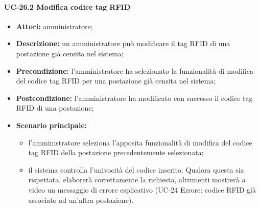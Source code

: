 \paragraph{UC-26.2 Modifica codice tag RFID}
\begin{itemize}
    \item \textbf{Attori:} amministratore;
    \item \textbf{Descrizione:} un amministratore pu\`{o} modificare il tag RFID di una postazione già censita nel sistema;
    \item \textbf{Precondizione:} l'amministratore ha selezionato la funzionalità di modifica del codice tag RFID per una postazione già censita nel sistema;
    \item \textbf{Postcondizione:} l'amministratore ha modificato con successo il codice tag RFID di una postazione;
    \item \textbf{Scenario principale:}
    \begin{itemize}
        \item l'amministratore seleziona l'apposita funzionalità di modifica del codice tag RFID della postazione precedentemente selezionata;
        \item il sistema controlla l'univocità del codice inserito. Qualora questa sia rispettata, elaborerà correttamente la richiesta, altrimenti mostrerà a video un messaggio di errore esplicativo (UC-24 Errore: codice RFID già associato ad un'altra postazione).
    \end{itemize}
\end{itemize}

 
